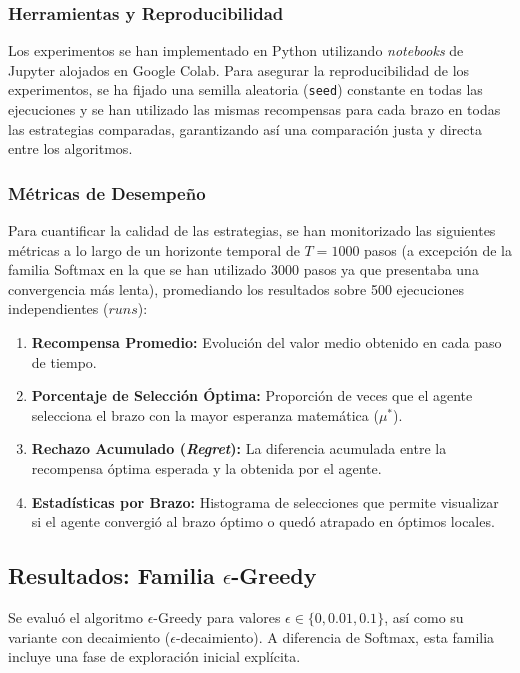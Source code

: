 \subsubsection{Herramientas y Reproducibilidad}
Los experimentos se han implementado en Python utilizando \textit{notebooks} de Jupyter alojados en Google Colab. 
Para asegurar la reproducibilidad de los experimentos, se ha fijado una semilla aleatoria (\texttt{seed}) 
constante en todas las ejecuciones y se han utilizado las mismas recompensas para cada brazo en todas las estrategias comparadas,
garantizando así una comparación justa y directa entre los algoritmos.

\subsubsection{Métricas de Desempeño}
Para cuantificar la calidad de las estrategias, se han monitorizado las siguientes métricas a lo largo 
de un horizonte temporal de $T=1000$ pasos (a excepción de la familia Softmax en la que se han utilizado 3000 pasos
ya que presentaba una convergencia más lenta), promediando los resultados sobre 500 ejecuciones independientes ($runs$):
\begin{enumerate}
    \item \textbf{Recompensa Promedio:} Evolución del valor medio obtenido en cada paso de tiempo.
    \item \textbf{Porcentaje de Selección Óptima:} Proporción de veces que el agente selecciona el brazo con la mayor esperanza matemática ($\mu^*$).
    \item \textbf{Rechazo Acumulado (\textit{Regret}):} La diferencia acumulada entre la recompensa óptima esperada y la obtenida por el agente.
    \item \textbf{Estadísticas por Brazo:} Histograma de selecciones que permite visualizar si el agente convergió al brazo óptimo o quedó atrapado en óptimos locales.
\end{enumerate}


\subsection{Resultados: Familia $\epsilon$-Greedy}

Se evaluó el algoritmo $\epsilon$-Greedy para valores $\epsilon \in \{0, 0.01, 0.1\}$, así como su variante con decaimiento ($\epsilon$-decaimiento). A diferencia de Softmax, esta familia incluye una fase de exploración inicial explícita.

